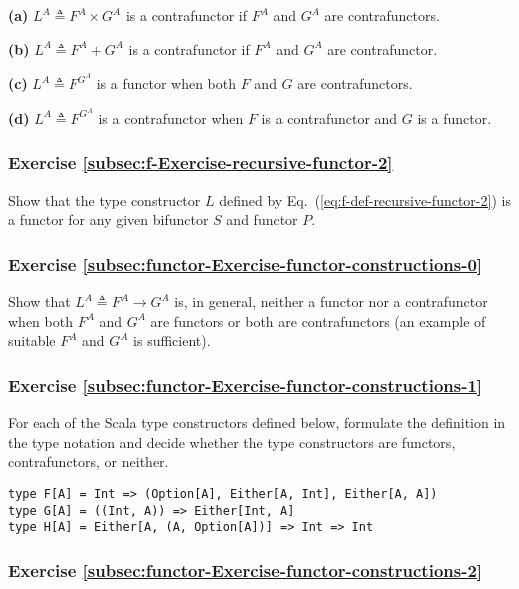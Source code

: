 \textbf{(a)} $L^{A}\triangleq F^{A}\times G^{A}$ is a contrafunctor
if $F^{A}$ and $G^{A}$ are contrafunctors.

\textbf{(b)} $L^{A}\triangleq F^{A}+G^{A}$ is a contrafunctor if
$F^{A}$ and $G^{A}$ are contrafunctor.

\textbf{(c)} $L^{A}\triangleq F^{G^{A}}$ is a functor when both $F$
and $G$ are contrafunctors.

\textbf{(d)} $L^{A}\triangleq F^{G^{A}}$ is a contrafunctor when
$F$ is a contrafunctor and $G$ is a functor.

\subsubsection{Exercise \label{subsec:f-Exercise-recursive-functor-2}\ref{subsec:f-Exercise-recursive-functor-2}}

Show that the type constructor $L$ defined by Eq.~(\ref{eq:f-def-recursive-functor-2})
is a functor for any given bifunctor $S$ and functor $P$. 

\subsubsection{Exercise \label{subsec:functor-Exercise-functor-constructions-0}\ref{subsec:functor-Exercise-functor-constructions-0}}

Show that $L^{A}\triangleq F^{A}\rightarrow G^{A}$ is, in general,
neither a functor nor a contrafunctor when both $F^{A}$ and $G^{A}$
are functors or both are contrafunctors (an example of suitable $F^{A}$
and $G^{A}$ is sufficient).

\subsubsection{Exercise \label{subsec:functor-Exercise-functor-constructions-1}\ref{subsec:functor-Exercise-functor-constructions-1}}

For each of the Scala type constructors defined below, formulate the
definition in the type notation and decide whether the type constructors
are functors, contrafunctors, or neither.
\begin{lstlisting}
type F[A] = Int => (Option[A], Either[A, Int], Either[A, A])
type G[A] = ((Int, A)) => Either[Int, A]
type H[A] = Either[A, (A, Option[A])] => Int => Int
\end{lstlisting}


\subsubsection{Exercise \label{subsec:functor-Exercise-functor-constructions-2}\ref{subsec:functor-Exercise-functor-constructions-2}}

